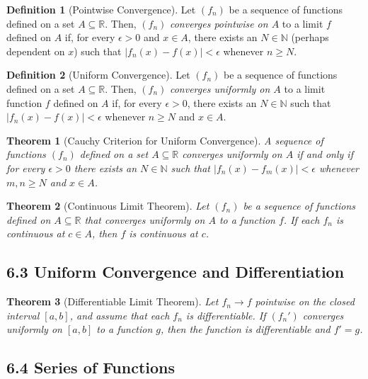 \documentclass{amsart}
\newtheorem*{theorem}{Theorem}
\theoremstyle{definition}
\newtheorem*{definition}{Definition}
\newcommand{\N}{\mathbb{N}}
\newcommand{\R}{\mathbb{R}}
\newcommand{\abs}[1]{|#1|}
\begin{document}
\begin{definition}[Pointwise Convergence]
  Let $(f_n)$ be a sequence of functions defined on a set $A \subseteq \R$.
  Then, $(f_n)$ \emph{converges pointwise on $A$} to a limit $f$ defined on $A$
  if, for every $\epsilon > 0$ and $x \in A$, there exists an $N \in \N$
  (perhaps dependent on $x$) such that $\abs{f_n(x) - f(x)} < \epsilon$ whenever
  $n \ge N$.
\end{definition}

\begin{definition}[Uniform Convergence]
  Let $(f_n)$ be a sequence of functions defined on a set $A \subseteq \R$.
  Then, $(f_n)$ \emph{converges uniformly on $A$} to a limit function $f$
  defined on $A$ if, for every $\epsilon > 0$, there exists an $N \in \N$ such
  that $\abs{f_n(x) - f(x)} < \epsilon$ whenever $n \ge N$ and $x \in A$.
\end{definition}

\begin{theorem}[Cauchy Criterion for Uniform Convergence]
  A sequence of functions $(f_n)$ defined on a set $A \subseteq \R$ converges
  uniformly on $A$ if and only if for every $\epsilon > 0$ there exists an $N
  \in \N$ such that $\abs{f_n(x) - f_m(x)} < \epsilon$ whenever $m, n \ge N$ and
  $x \in A$.
\end{theorem}

\begin{theorem}[Continuous Limit Theorem]
  Let $(f_n)$ be a sequence of functions defined on $A \subseteq \R$ that
  converges uniformly on $A$ to a function $f$. If each $f_n$ is continuous at
  $c \in A$, then $f$ is continuous at $c$.
\end{theorem}

\subsection*{6.3 Uniform Convergence and Differentiation}

\begin{theorem}[Differentiable Limit Theorem]
  Let $f_n \to f$ pointwise on the closed interval $[a, b]$, and assume that
  each $f_n$ is differentiable. If $(f_n')$ converges uniformly on $[a, b]$ to a
  function $g$, then the function is differentiable and $f' = g$.
\end{theorem}

\subsection*{6.4 Series of Functions}
\end{document}
